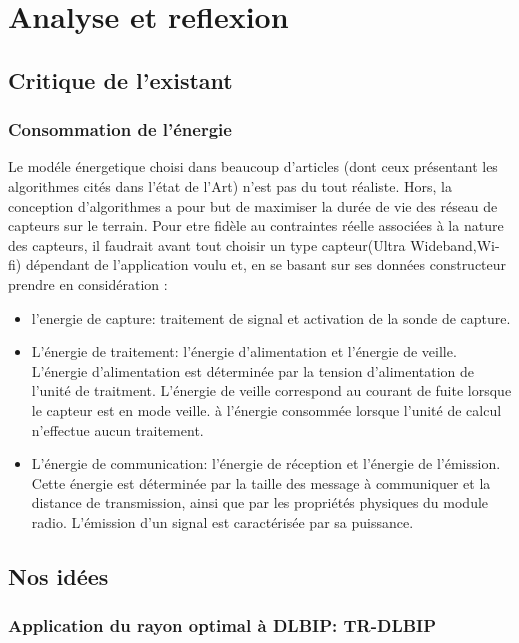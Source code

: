 
\chapter{Analyse et reflexion}\label{Analyse_et_reflexion}


\section{Critique de l'existant}
\subsection{Consommation de l'énergie}
	
Le modéle énergetique choisi dans beaucoup d'articles (dont ceux présentant les algorithmes cités dans l'état de l'Art) n'est pas du tout réaliste.
Hors, la conception d'algorithmes a pour but de maximiser la durée de vie des réseau de capteurs sur le terrain. Pour etre fidèle au contraintes 
réelle associées à la nature des capteurs, il faudrait avant tout choisir un type capteur(Ultra Wideband,Wi-fi) dépendant de l'application voulu et, en se basant sur ses données constructeur prendre en considération :
\begin{itemize}
\item l'energie de capture: traitement de signal et activation de la sonde de capture.
\item L’énergie de traitement: l’énergie d'alimentation et l’énergie de veille. L’énergie d'alimentation est déterminée par la tension d’alimentation de l'unité de traitment. L'énergie de veille correspond au courant de fuite lorsque le capteur est en mode veille.
à l’énergie consommée lorsque l’unité de calcul n’effectue aucun traitement.
\item L’énergie de communication: l’énergie de réception et l’énergie de l’émission. Cette énergie est déterminée par la taille des message à
communiquer et la distance de transmission, ainsi que par les propriétés physiques du module
radio. L’émission d’un signal est caractérisée par sa puissance. 
\end{itemize}

\section{Nos idées}

\subsection{Application du rayon optimal à DLBIP: TR-DLBIP}

